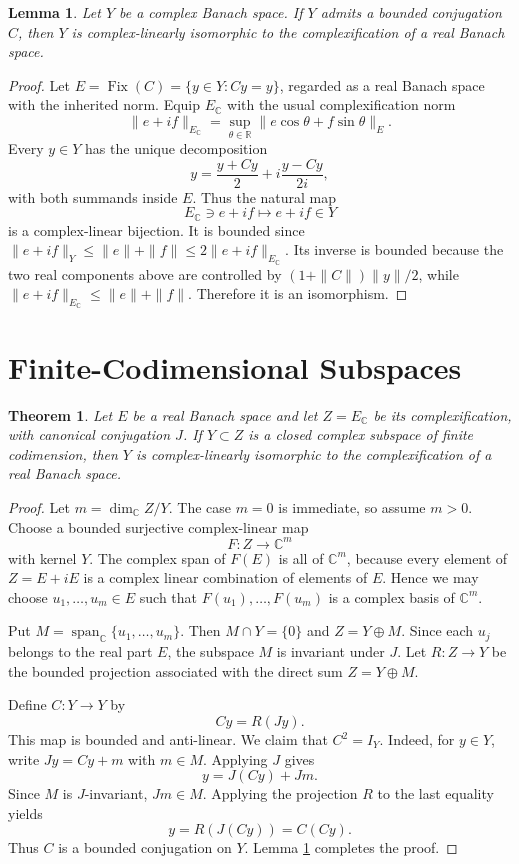 \documentclass[11pt]{article}
\newtheorem{theorem}{Theorem}
\newtheorem{lemma}{Lemma}
\theoremstyle{remark}
\newcommand{\C}{\mathbb C}
\newcommand{\R}{\mathbb R}
\newcommand{\Fix}{\operatorname{Fix}}
\begin{document}
\begin{lemma}\label{lem:conjugation-real-form}
Let \(Y\) be a complex Banach space.  If \(Y\) admits a bounded conjugation
\(C\), then \(Y\) is complex-linearly isomorphic to the complexification of a
real Banach space.
\end{lemma}

\begin{proof}
Let \(E=\Fix(C)=\{y\in Y:Cy=y\}\), regarded as a real Banach space with the
inherited norm.  Equip \(E_\C\) with the usual complexification norm
\[
  \|e+if\|_{E_\C}=\sup_{\theta\in\R}\|e\cos\theta+f\sin\theta\|_E .
\]
Every \(y\in Y\) has the unique decomposition
\[
  y=\frac{y+Cy}{2}+i\frac{y-Cy}{2i},
\]
with both summands inside \(E\).  Thus the natural map
\[
  E_\C\ni e+if\longmapsto e+if\in Y
\]
is a complex-linear bijection.  It is bounded since
\(\|e+if\|_Y\leq \|e\|+\|f\|\leq 2\|e+if\|_{E_\C}\).  Its inverse is bounded
because the two real components above are controlled by
\((1+\|C\|)\|y\|/2\), while
\(\|e+if\|_{E_\C}\leq \|e\|+\|f\|\).  Therefore it is an isomorphism.
\end{proof}

\section{Finite-Codimensional Subspaces}

\begin{theorem}\label{thm:finite-codim}
Let \(E\) be a real Banach space and let \(Z=E_\C\) be its complexification,
with canonical conjugation \(J\).  If \(Y\subset Z\) is a closed complex
subspace of finite codimension, then \(Y\) is complex-linearly isomorphic to
the complexification of a real Banach space.
\end{theorem}

\begin{proof}
Let \(m=\dim_\C Z/Y\).  The case \(m=0\) is immediate, so assume \(m>0\).
Choose a bounded surjective complex-linear map
\[
  F:Z\to \C^m
\]
with kernel \(Y\).  The complex span of \(F(E)\) is all of \(\C^m\), because
every element of \(Z=E+iE\) is a complex linear combination of elements of
\(E\).  Hence we may choose \(u_1,\ldots,u_m\in E\) such that
\(F(u_1),\ldots,F(u_m)\) is a complex basis of \(\C^m\).

Put \(M=\operatorname{span}_\C\{u_1,\ldots,u_m\}\).  Then \(M\cap Y=\{0\}\)
and \(Z=Y\oplus M\).  Since each \(u_j\) belongs to the real part \(E\), the
subspace \(M\) is invariant under \(J\).  Let \(R:Z\to Y\) be the bounded
projection associated with the direct sum \(Z=Y\oplus M\).

Define \(C:Y\to Y\) by
\[
  Cy=R(Jy).
\]
This map is bounded and anti-linear.  We claim that \(C^2=I_Y\).  Indeed, for
\(y\in Y\), write \(Jy=Cy+m\) with \(m\in M\).  Applying \(J\) gives
\[
  y=J(Cy)+Jm.
\]
Since \(M\) is \(J\)-invariant, \(Jm\in M\).  Applying the projection \(R\) to
the last equality yields
\[
  y=R(J(Cy))=C(Cy).
\]
Thus \(C\) is a bounded conjugation on \(Y\).  Lemma
\ref{lem:conjugation-real-form} completes the proof.
\end{proof}
\end{document}
